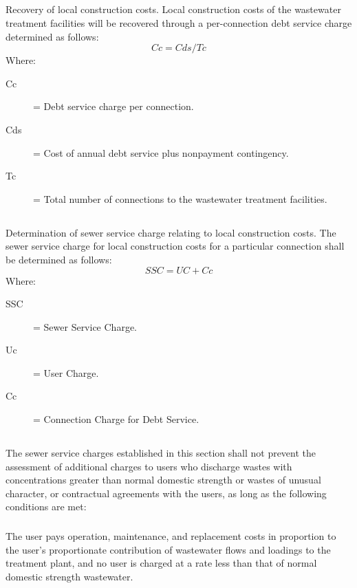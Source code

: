 \subsection{}
Recovery of local construction costs.  Local construction costs of the wastewater treatment facilities will be recovered through a per-connection debt service charge determined as follows:
\begin{equation*}
Cc = Cds/Tc
\end{equation*}
Where:
\begin{description}
\item[Cc] = Debt service charge per connection.
\item[Cds] = Cost of annual debt service plus nonpayment contingency.
\item[Tc] = Total number of connections to the wastewater treatment facilities.
\end{description}
\subsection{}
Determination of sewer service charge relating to local construction costs.  The sewer service charge for local construction costs for a particular connection shall be determined as follows:
\begin{equation*}
SSC = UC + Cc
\end{equation*}
Where:
\begin{description}
\item[SSC] = Sewer Service Charge.
\item[Uc] = User Charge.
\item[Cc] = Connection Charge for Debt Service.
\end{description}
\subsection{}
The sewer service charges established in this section shall not prevent the assessment of additional charges to users who discharge wastes with concentrations greater than normal domestic strength or wastes of unusual character, or contractual agreements with the users, as long as the following conditions are met:
\subsubsection{}
The user pays operation, maintenance, and replacement costs in proportion to the user’s proportionate contribution of wastewater flows and loadings to the treatment plant, and no user is charged at a rate less than that of normal domestic strength wastewater.
